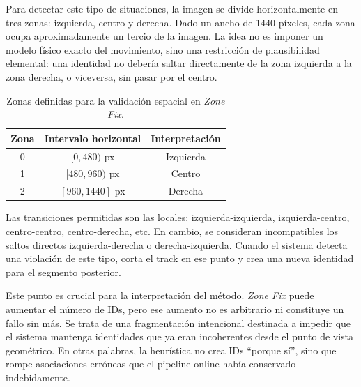\documentclass[../MAIN.tex]{subfiles}
\begin{document}
	Para detectar este tipo de situaciones, la imagen se divide horizontalmente en tres zonas: izquierda, centro y derecha. Dado un ancho de 1440 píxeles, cada zona ocupa aproximadamente un tercio de la imagen. La idea no es imponer un modelo físico exacto del movimiento, sino una restricción de plausibilidad elemental: una identidad no debería saltar directamente de la zona izquierda a la zona derecha, o viceversa, sin pasar por el centro.
	
	\begin{table}[H]
		\centering
		\caption{Zonas definidas para la validación espacial en \textit{Zone Fix}.}
		\label{tab:cap12_zonas}
		\begin{tabular}{ccc}
			\toprule
			\textbf{Zona} & \textbf{Intervalo horizontal} & \textbf{Interpretación} \\
			\midrule
			0 & \([0,480)\) px & Izquierda \\
			1 & \([480,960)\) px & Centro \\
			2 & \([960,1440]\) px & Derecha \\
			\bottomrule
		\end{tabular}
	\end{table}
	
	Las transiciones permitidas son las locales: izquierda-izquierda, izquierda-centro, centro-centro, centro-derecha, etc. En cambio, se consideran incompatibles los saltos directos izquierda-derecha o derecha-izquierda. Cuando el sistema detecta una violación de este tipo, corta el track en ese punto y crea una nueva identidad para el segmento posterior.
	
	
	Este punto es crucial para la interpretación del método. \textit{Zone Fix} puede aumentar el número de IDs, pero ese aumento no es arbitrario ni constituye un fallo sin más. Se trata de una fragmentación intencional destinada a impedir que el sistema mantenga identidades que ya eran incoherentes desde el punto de vista geométrico. En otras palabras, la heurística no crea IDs “porque sí”, sino que rompe asociaciones erróneas que el pipeline online había conservado indebidamente.
	
\end{document}
